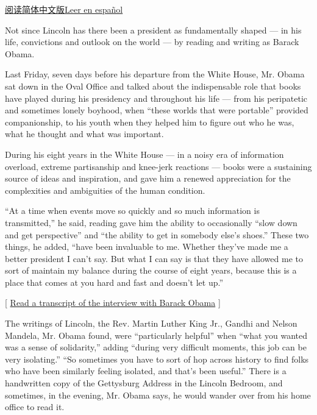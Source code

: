 \href{http://cn.nytstyle.com/international/20170117/obamas-secret-to-surviving-the-white-house-years-books/}{阅读简体中文版}\href{https://www.nytimes3xbfgragh.onion/es/2017/01/17/los-libros-que-ayudaron-a-barack-obama-en-la-casa-blanca}{Leer
en español}

Not since Lincoln has there been a president as fundamentally shaped ---
in his life, convictions and outlook on the world --- by reading and
writing as Barack Obama.

Last Friday, seven days before his departure from the White House, Mr.
Obama sat down in the Oval Office and talked about the indispensable
role that books have played during his presidency and throughout his
life --- from his peripatetic and sometimes lonely boyhood, when ``these
worlds that were portable'' provided companionship, to his youth when
they helped him to figure out who he was, what he thought and what was
important.

During his eight years in the White House --- in a noisy era of
information overload, extreme partisanship and knee-jerk reactions ---
books were a sustaining source of ideas and inspiration, and gave him a
renewed appreciation for the complexities and ambiguities of the human
condition.

``At a time when events move so quickly and so much information is
transmitted,'' he said, reading gave him the ability to occasionally
``slow down and get perspective'' and ``the ability to get in somebody
else's shoes.'' These two things, he added, ``have been invaluable to
me. Whether they've made me a better president I can't say. But what I
can say is that they have allowed me to sort of maintain my balance
during the course of eight years, because this is a place that comes at
you hard and fast and doesn't let up.''

{[}
\href{https://www.nytimes3xbfgragh.onion/2017/01/16/books/transcript-president-obama-on-what-books-mean-to-him.html}{Read
a transcript of the interview with Barack Obama} {]}

The writings of Lincoln, the Rev. Martin Luther King Jr., Gandhi and
Nelson Mandela, Mr. Obama found, were ``particularly helpful'' when
``what you wanted was a sense of solidarity,'' adding ``during very
difficult moments, this job can be very isolating.'' ``So sometimes you
have to sort of hop across history to find folks who have been similarly
feeling isolated, and that's been useful.'' There is a handwritten copy
of the Gettysburg Address in the Lincoln Bedroom, and sometimes, in the
evening, Mr. Obama says, he would wander over from his home office to
read it.


